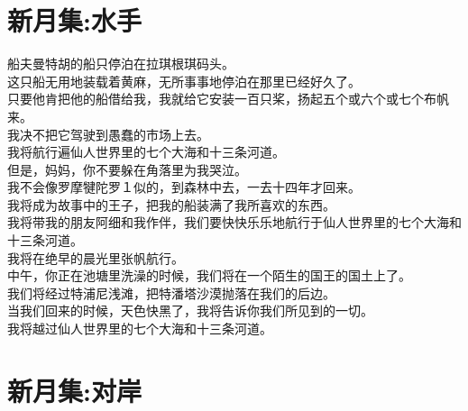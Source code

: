 \documentclass[
]{book}
\renewenvironment{quote}{\begin{VF}}{\end{VF}}
\begin{document}
\hypertarget{section-43}{%
\section{新月集:水手}\label{section-43}}

\begin{quote}
船夫曼特胡的船只停泊在拉琪根琪码头。\\
这只船无用地装载着黄麻，无所事事地停泊在那里已经好久了。\\
只要他肯把他的船借给我，我就给它安装一百只桨，扬起五个或六个或七个布帆来。\\
我决不把它驾驶到愚蠢的市场上去。\\
我将航行遍仙人世界里的七个大海和十三条河道。\\
但是，妈妈，你不要躲在角落里为我哭泣。\\
我不会像罗摩犍陀罗１似的，到森林中去，一去十四年才回来。\\
我将成为故事中的王子，把我的船装满了我所喜欢的东西。\\
我将带我的朋友阿细和我作伴，我们要快快乐乐地航行于仙人世界里的七个大海和十三条河道。\\
我将在绝早的晨光里张帆航行。\\
中午，你正在池塘里洗澡的时候，我们将在一个陌生的国王的国土上了。\\
我们将经过特浦尼浅滩，把特潘塔沙漠抛落在我们的后边。\\
当我们回来的时候，天色快黑了，我将告诉你我们所见到的一切。\\
我将越过仙人世界里的七个大海和十三条河道。
\end{quote}

\hypertarget{section-44}{%
\section{新月集:对岸}\label{section-44}}
\end{document}
